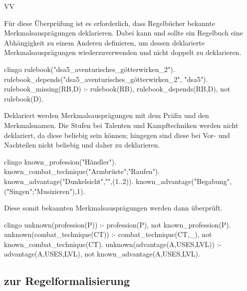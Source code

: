 \begin{enumerateWithCode}{VV}
    \item\label{itm:VV.RulebookFact} Für diese Überprüfung ist es erforderlich, dass Regelbücher bekannte Merkmalsausprägungen deklarieren.
    Dabei kann und sollte ein Regelbuch eine Abhängigkeit zu einem Anderen definieren, um dessen deklarierte Merkmalsausprägungen wiederzuverwenden und nicht doppelt zu deklarieren.
    \begin{mintedNameless}{clingo}
rulebook("dsa5_aventurisches_götterwirken_2").
rulebook_depends("dsa5_aventurisches_götterwirken_2", "dsa5").
rulebook_missing(RB,D) :- rulebook(RB), rulebook_depends(RB,D), not rulebook(D).
    \end{mintedNameless}

    \item Deklariert werden Merkmalsausprägungen mit dem Präfix  und den Merkmalsnamen.
    Die Stufen bei \zB Talenten und Kampftechniken werden nicht deklariert, da diese beliebig sein können;
    hingegen sind diese bei Vor- und Nachteilen nicht beliebig und daher zu deklarieren.
    \begin{mintedNameless}{clingo}
known_profession("Händler").
known_combat_technique("Armbrüste";"Raufen").
known_advantage("Dunkelsicht","",(1..2)).
known_advantage("Begabung",("Singen";"Musizieren"),1).
    \end{mintedNameless}

    \item\label{itm:VV.Unknown} Diese somit bekannten Merkmalsausprägungen werden dann überprüft.
    \begin{mintedNameless}{clingo}
unknown(profession(P)) :- profession(P), not known_profession(P).
unknown(combat_technique(CT)) :- combat_technique(CT,_), not known_combat_technique(CT).
unknown(advantage(A,USES,LVL)) :- advantage(A,USES,LVL), not known_advantage(A,USES,LVL).
    \end{mintedNameless}
\end{enumerateWithCode}


\subsection{ zur Regelformalisierung}\label{subsec:kochbuch-zur-regelformalisierung}

